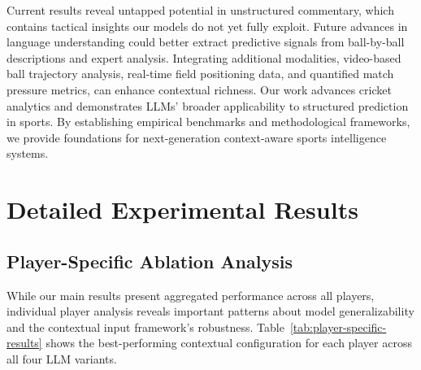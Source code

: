 \documentclass[sigconf,anonymous,review]{acmart}
\begin{document}
Current results reveal untapped potential in unstructured commentary, which contains tactical insights our models do not yet fully exploit. Future advances in language understanding could better extract predictive signals from ball-by-ball descriptions and expert analysis. Integrating additional modalities, video-based ball trajectory analysis, real-time field positioning data, and quantified match pressure metrics, can enhance contextual richness.
Our work advances cricket analytics and demonstrates LLMs' broader applicability to structured prediction in sports. By establishing empirical benchmarks and methodological frameworks, we provide foundations for next-generation context-aware sports intelligence systems.






\clearpage
\appendix

\section{Detailed Experimental Results}
\label{sec:appendix}

\subsection{Player-Specific Ablation Analysis}
\label{subsec:player-ablation}

While our main results present aggregated performance across all players, individual player analysis reveals important patterns about model generalizability and the contextual input framework's robustness. Table~\ref{tab:player-specific-results} shows the best-performing contextual configuration for each player across all four LLM variants.
\end{document}
